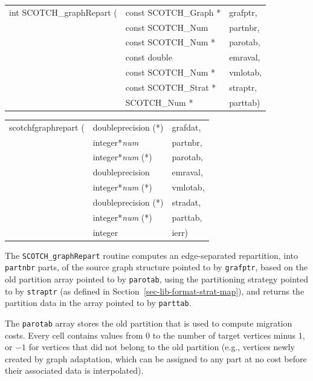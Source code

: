 \begin{itemize}
\progsyn

{\tt\begin{tabular}{l@{}ll}
int SCOTCH\_graphRepart ( & const SCOTCH\_Graph * & grafptr, \\
                          & const SCOTCH\_Num     & partnbr, \\
                          & const SCOTCH\_Num *   & parotab, \\
                          & const double          & emraval, \\
                          & const SCOTCH\_Num *   & vmlotab, \\
                          & const SCOTCH\_Strat * & straptr, \\
                          & SCOTCH\_Num *         & parttab)
\end{tabular}}

{\tt\begin{tabular}{l@{}ll}
scotchfgraphrepart ( & doubleprecision (*)   & grafdat, \\
                     & integer*{\it num}     & partnbr, \\
                     & integer*{\it num} (*) & parotab, \\
                     & doubleprecision       & emraval, \\
                     & integer*{\it num} (*) & vmlotab, \\
                     & doubleprecision (*)   & stradat, \\
                     & integer*{\it num} (*) & parttab, \\
                     & integer               & ierr)
\end{tabular}}

\progdes

The {\tt SCOTCH\_graphRepart} routine computes an edge-separated
repartition, into {\tt partnbr} parts, of the source graph structure
pointed to by {\tt grafptr}, based on the old partition array pointed
to by {\tt parotab}, using the partitioning strategy pointed to by
{\tt straptr} (as defined in Section~\ref{sec-lib-format-strat-map}), and
returns the partition data in the array pointed to by {\tt parttab}.

The {\tt parotab} array stores the old partition that is used to
compute migration costs. Every cell contains values from $0$ to the
number of target vertices minus $1$, or $-1$ for vertices that did not
belong to the old partition (e.g., vertices newly created by graph
adaptation, which can be assigned to any part at no cost before
their associated data is interpolated).


\end{itemize}
